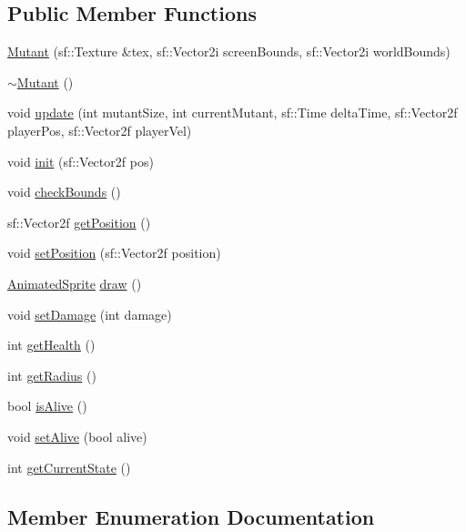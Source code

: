 \subsection*{Public Member Functions}
\begin{DoxyCompactItemize}
\item 
\hyperlink{class_mutant_a2c80776724cca166b639e5e433deda42}{Mutant} (sf\+::\+Texture \&tex, sf\+::\+Vector2i screen\+Bounds, sf\+::\+Vector2i world\+Bounds)
\item 
\hyperlink{class_mutant_a03dc2cf4d08ea08bea6cd4ded784dfc1}{$\sim$\+Mutant} ()
\item 
void \hyperlink{class_mutant_aa334f3574bc0a367e0cc722a900b35da}{update} (int mutant\+Size, int current\+Mutant, sf\+::\+Time delta\+Time, sf\+::\+Vector2f player\+Pos, sf\+::\+Vector2f player\+Vel)
\item 
void \hyperlink{class_mutant_a43fe449ecbb708a19095cd030b399cee}{init} (sf\+::\+Vector2f pos)
\item 
void \hyperlink{class_mutant_a46424e3134923fed261aec4cfeee43d5}{check\+Bounds} ()
\item 
sf\+::\+Vector2f \hyperlink{class_mutant_ab20f22800bae3c7587beb641248412ac}{get\+Position} ()
\item 
void \hyperlink{class_mutant_a10a34b2ddc9177b0da17fa8bc77d48c7}{set\+Position} (sf\+::\+Vector2f position)
\item 
\hyperlink{class_animated_sprite}{Animated\+Sprite} \hyperlink{class_mutant_ad085db34f2e45e82b6b7bb6bfc4be1c7}{draw} ()
\item 
void \hyperlink{class_mutant_a7632057c37a56ed27df3d692b5357c6a}{set\+Damage} (int damage)
\item 
int \hyperlink{class_mutant_ae80452778ea58cf79ff76a1a481712af}{get\+Health} ()
\item 
int \hyperlink{class_mutant_afb53c9562d5e98d5f6749024d09d132e}{get\+Radius} ()
\item 
bool \hyperlink{class_mutant_ab92626e4168187b7bf49073e0626e071}{is\+Alive} ()
\item 
void \hyperlink{class_mutant_ae31d5187569549ce0c6346c8bef31bd4}{set\+Alive} (bool alive)
\item 
int \hyperlink{class_mutant_a07b88089382dcc84f261ee3d3d9a009b}{get\+Current\+State} ()
\end{DoxyCompactItemize}


\subsection{Member Enumeration Documentation}
\mbox{\label{class_mutant_a0b6d537f129ebc093f65e745a25eaf6a}} 
